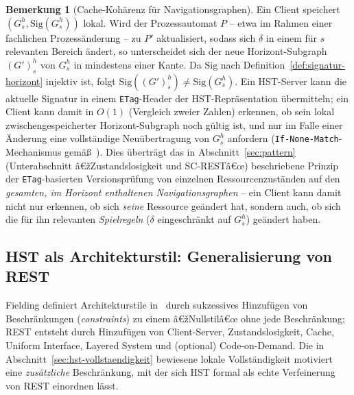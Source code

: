 ﻿\documentclass[a4paper,12pt]{article}
\theoremstyle{definition}
\newtheorem{bemerkung}{Bemerkung}
\begin{document}
\begin{bemerkung}[Cache-Kohärenz für Navigationsgraphen]
	\label{bem:cache-kohaerenz}
	Ein Client speichert $(G_s^h,\mathrm{Sig}(G_s^h))$ lokal. Wird der Prozessautomat
	$P$ -- etwa im Rahmen einer fachlichen Prozessänderung -- zu $P'$ aktualisiert,
	sodass sich $\delta$ in einem für $s$ relevanten Bereich ändert, so unterscheidet
	sich der neue Horizont-Subgraph $(G')_s^h$ von $G_s^h$ in mindestens einer Kante.
	Da $\mathrm{Sig}$ nach Definition~\ref{def:signatur-horizont} injektiv ist, folgt
	$\mathrm{Sig}((G')_s^h)\ne\mathrm{Sig}(G_s^h)$. Ein HST-Server kann die aktuelle
	Signatur in einem \texttt{ETag}-Header der HST-Repräsentation übermitteln; ein
	Client kann damit in $O(1)$ (Vergleich zweier Zahlen) erkennen, ob sein lokal
	zwischengespeicherter Horizont-Subgraph noch gültig ist, und nur im Falle einer
	Änderung eine vollständige Neuübertragung von $G_s^h$ anfordern
	(\texttt{If-None-Match}-Mechanismus gemäß~\cite{rfc7231}). Dies überträgt das in
	Abschnitt~\ref{sec:pattern} (Unterabschnitt â€žZustandslosigkeit und SC-RESTâ€œ)
	beschriebene Prinzip der \texttt{ETag}-basierten Versionsprüfung von einzelnen
	Ressourcenzuständen auf den \emph{gesamten, im Horizont enthaltenen
	Navigationsgraphen} -- ein Client kann damit nicht nur erkennen, ob sich
	\emph{seine} Ressource geändert hat, sondern auch, ob sich die für ihn relevanten
	\emph{Spielregeln} ($\delta$ eingeschränkt auf $G_s^h$) geändert haben.
\end{bemerkung}

\subsection{HST als Architekturstil: Generalisierung von REST}
\label{sec:hst-architekturstil}

Fielding definiert Architekturstile in~\cite{fielding2000} durch sukzessives Hinzufügen
von Beschränkungen (\emph{constraints}) zu einem â€žNullstilâ€œ ohne jede Beschränkung; REST
entsteht durch Hinzufügen von Client-Server, Zustandslosigkeit, Cache, Uniform
Interface, Layered System und (optional) Code-on-Demand. Die in
Abschnitt~\ref{sec:hst-vollstaendigkeit} bewiesene lokale Vollständigkeit motiviert eine
\emph{zusätzliche} Beschränkung, mit der sich HST formal als echte Verfeinerung von REST
einordnen lässt.
\end{document}
